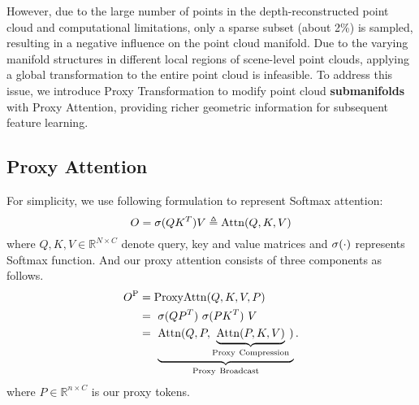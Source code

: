 However, due to the large number of points in the depth-reconstructed point cloud and computational limitations, only a sparse subset (about 2\%) is sampled, resulting in a negative influence on the point cloud manifold. Due to the varying manifold structures in different local regions of scene-level point clouds, applying a global transformation to the entire point cloud is infeasible. To address this issue, we introduce Proxy Transformation to modify point cloud \textbf{submanifolds} with Proxy Attention, providing richer geometric information for subsequent feature learning.

\subsection{Proxy Attention}
\label{sub:proxy}
For simplicity, we use following formulation to represent Softmax attention:
\begin{equation}
    O = {\rm \sigma}(QK^T)V \triangleq {\rm Attn}(Q,K,V)
\end{equation}
where $ Q, K, V\in\mathbb{R}^{N \times C} $ denote query, key and value matrices and $\rm{\sigma}(\cdot)$ represents Softmax function. And our proxy attention consists of three components as follows.
\begin{equation} \label{eq:attn}
    \begin{split}
        O^{\rm P}&= {\rm ProxyAttn}(Q,K,V,P) \\
        &=\ {\rm \sigma}(QP^T)\ {\rm \sigma}(PK^T)\ V \\ 
        &=\ \underbrace{{\rm Attn}(Q,P,\underbrace{{\rm Attn}(P,K,V)}_{\rm Proxy\ Compression})}_{\rm Proxy\ Broadcast}. \\
    \end{split}
\end{equation}
where \(P \in \mathbb{R}^{n \times C} \) is our proxy tokens.

